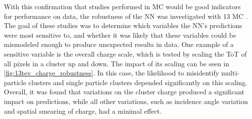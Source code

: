 With this confirmation that studies performed in \ac{MC} would be good indicators for performance on data, the robustness of the \ac{NN} was investigated with 13 \tev \ac{MC} \cite{ATL-PHYS-PUB-2015-052}. The goal of these studies was to determine which variables the \ac{NN}'s predictions were most sensitive to, and whether it was likely that these variables could be mismodeled enough to produce unexpected results in data. One example of a sensitive variable is the overall charge scale, which is tested by scaling the \ac{ToT} of all pixels in a cluster up and down. The impact of its scaling can be seen in \autoref{fig:13tev_charge_robustness}. In this case, the likelihood to misidentify multi-particle clusters and single particle clusters depended significantly on this scaling. Overall, it was found that variations on the cluster charge produced a significant impact on predictions, while all other variations, such as incidence angle variation and spatial smearing of charge, had a minimal effect. 

